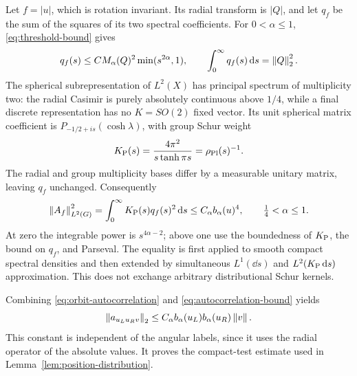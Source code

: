 Let $f=|u|$, which is rotation invariant. Its radial transform is $|Q|$,
and let $q_f$ be the sum of the squares of its two spectral coefficients.
For $0<\alpha\le1$, \eqref{eq:threshold-bound} gives
\begin{equation}
 q_f(s)\le C M_\alpha(Q)^2\min(s^{2\alpha},1),\qquad
 \int_0^\infty q_f(s)\mathop{}\!\mathrm d s=\left\lVert Q\right\rVert_2^2.
\end{equation}
The spherical subrepresentation of $L^2(X)$ has principal spectrum of
multiplicity two: the radial Casimir is purely absolutely continuous above
$1/4$, while a final discrete representation has no $K=SO(2)$ fixed vector.
Its unit spherical matrix coefficient is
$P_{-1/2+is}(\cosh\lambda)$, with group Schur weight~\cite{MY,DLMF}
\begin{equation}
 K_{\mathrm P}(s)=\frac{4\pi^2}{s\tanh\pi s}=\rho_{\mathrm{Pl}}(s)^{-1}.
\end{equation}
The radial and group multiplicity bases differ by a measurable unitary
matrix, leaving $q_f$ unchanged. Consequently
\begin{equation}
 \left\lVert A_f\right\rVert_{L^2(G)}^2=\int_0^\infty K_{\mathrm P}(s)q_f(s)^2\mathop{}\!\mathrm d s
 \le C_\alpha b_\alpha(u)^4,\qquad \tfrac14<\alpha\le1.
 \label{eq:autocorrelation-bound}
\end{equation}
At zero the integrable power is $s^{4\alpha-2}$; above one use the
boundedness of $K_{\mathrm P}$, the bound on $q_f$, and Parseval. The equality is
first applied to smooth compact spectral densities and then extended by
simultaneous $L^1(\dd s)$ and $L^2(K_{\mathrm P}\mathop{}\!\mathrm d s)$ approximation. This does
not exchange arbitrary distributional Schur kernels.

Combining \eqref{eq:orbit-autocorrelation} and
\eqref{eq:autocorrelation-bound} yields
\begin{equation}
 \left\lVert a_{u_Lu_Rv}\right\rVert_2
 \le C_\alpha b_\alpha(u_L)b_\alpha(u_R)\left\lVert v\right\rVert.
 \label{eq:product-orbit-bound}
\end{equation}
This constant is independent of the angular labels, since it uses the
radial operator of the absolute values. It proves the compact-test
estimate used in Lemma~\ref{lem:position-distribution}.

